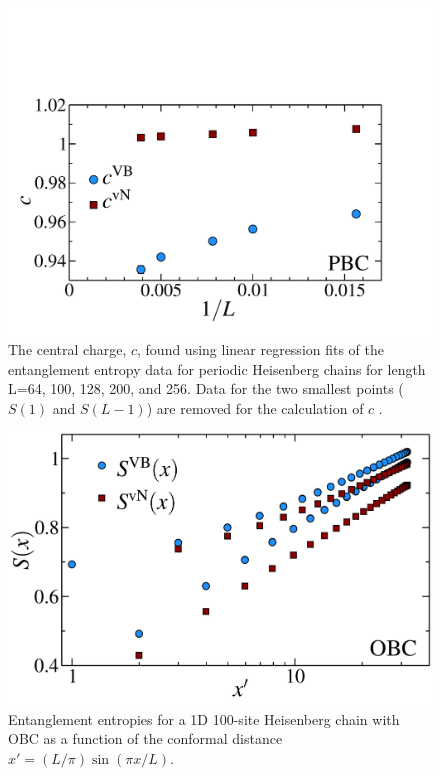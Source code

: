 \begin{figure} {
\includegraphics[width=6in]{./figures/paper1/figure1/thesis_c1.pdf} 
	\centering
	\caption[1D Results for VB EE and von Neumann EE]{
	The central charge, $c$, found using linear regression fits of the entanglement entropy data 	for periodic Heisenberg chains for length L=64, 100, 128, 200, and 256.  Data for the two smallest 	points ($S(1)$ and $S(L-1)$) are removed for the calculation of $c$ .
	\label{c1}}
} 
\end{figure}


\begin{figure} {
	\includegraphics[width=5in]{./figures/paper1/figure1/thesis_obc.pdf} 
	\centering
	\caption[1D OBC Results for VB EE and von Neumann EE]{
	Entanglement entropies for a 1D 100-site Heisenberg chain with OBC as a function of the conformal distance $x'  = (L/\pi)\sin (\pi x/L)$.
	\label{1dOBC}}}
\end{figure}

